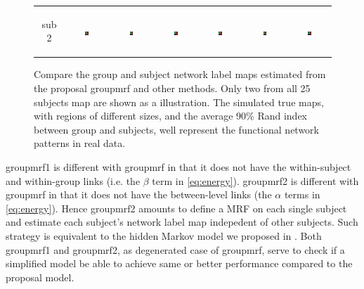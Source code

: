 \documentclass[final,authoryear,5p,twocolumn]{elsarticle}
\begin{document}
\begin{figure}[htb]
\begin{tabular}[]{ccccccc}
      \begin{sideways}sub 2 \end{sideways} &
      \includegraphics[width=0.1\textwidth]{figures/syn/truth/sub02} &
      \includegraphics[width=0.1\textwidth]{figures/syn/smooth_kmeans/sub02} &
      \includegraphics[width=0.1\textwidth]{figures/syn/smooth_ncuts/sub02} &
      \includegraphics[width=0.1\textwidth]{figures/syn/smooth_groupmrf/sub02} &
      \includegraphics[width=0.1\textwidth]{figures/syn/nonsmooth_onelevel/sub02} &
      \includegraphics[width=0.1\textwidth]{figures/syn/nonsmooth_groupmrf/sub02} 
  \end{tabular}
  \caption{Compare the group and subject network label maps estimated from the
    proposal \textsf{groupmrf} and other methods. Only two from all 25 subjects
    map are shown as a illustration. The simulated true maps, with regions of
    different sizes, and the average 90\% Rand index between group and subjects, well
    represent the functional network patterns in real data.}
  \label{fig:synmap}
\end{figure}

\textsf{groupmrf1} is different with \textsf{groupmrf} in that it does not have
the within-subject and within-group links (i.e. the $\beta$ term in
\eqref{eq:energy}). \textsf{groupmrf2} is different with \textsf{groupmrf} in
that it does not have the between-level links (the $\alpha$ terms in
\eqref{eq:energy}). Hence \textsf{groupmrf2} amounts to define a MRF on each
single subject and estimate each subject's network label map indepedent of other
subjects. Such strategy is equivalent to the hidden Markov model we proposed in
\citet{liu2011monte}.  Both \textsf{groupmrf1} and \textsf{groupmrf2}, as
degenerated case of \textsf{groupmrf}, serve to check if a simplified model be
able to achieve same or better performance compared to the proposal model.
\end{document}
